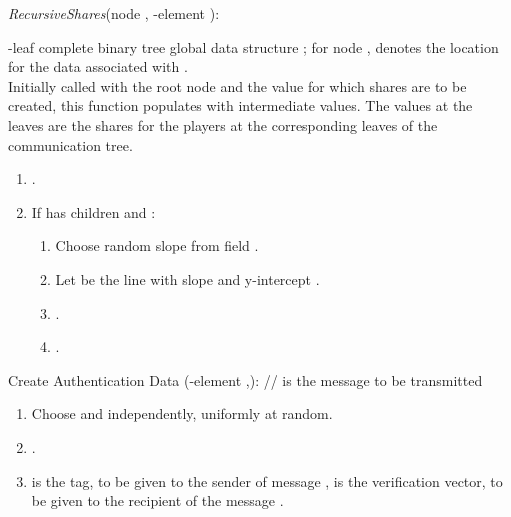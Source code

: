 \documentclass[12pt]{article}
\theoremstyle{definition}
\newcommand{\recursiveShares}{\emph{RecursiveShares}\xspace}
\begin{document}
\begin{algorithm}
\caption{ \recursiveShares(node  , -element ):}\label{alg:shares}
-leaf complete binary tree global data structure ; for node , 
 denotes the location for the data associated with .\\
Initially called with the root node and the value for which shares are to be 
created, this function populates  with 
intermediate values. The values at the leaves are the shares for the players 
at the corresponding leaves of the  communication tree.
\begin{enumerate}
\item .
\item If  has children  and :
	\begin{enumerate}
	\item Choose random slope  from field .
	\item Let  be the line with slope  and y-intercept .
	\item .
	\item .
	\end{enumerate}
\end{enumerate}
\label{alg:recursiveShares} 
\end{algorithm}

\begin{algorithm}
\caption{Create Authentication Data (-element ,):   
//  is the message to be transmitted} \label{alg:verification}
\begin{enumerate}
\item Choose  and  independently, 
uniformly at random.
\item .
\item  is the tag, to be given to the sender of message ,  is the 
verification vector, to be given to the recipient of the message .  
\end{enumerate}
\end{algorithm}
\end{document}
